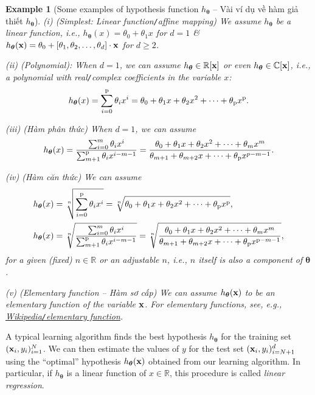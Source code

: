 \documentclass{article}
\newtheorem{example}{Example}
\begin{document}
\begin{example}[Some examples of hypothesis function $h_{\boldsymbol{\theta}}$ -- Vài ví dụ về hàm giả thiết $h_{\boldsymbol{\theta}}$]
	\item(i) {\rm(Simplest: Linear function{\tt/}affine mapping)} We assume $h_{\boldsymbol{\theta}}$ be a linear function, i.e., $h_{\boldsymbol{\theta}}(x) = \theta_0 + \theta_1x$ for $d = 1$ \& $h_{\boldsymbol{\theta}}({\bf x}) = \theta_0 + [\theta_1,\theta_2,\ldots,\theta_d]\cdot{\bf x}$ for $d\ge2$.
	\item(ii) {\rm(Polynomial)}: When $d = 1$, we can assume $h_{\boldsymbol{\theta}}\in\mathbb{R}[{\bf x}]$ or even $h_{\boldsymbol{\theta}}\in\mathbb{C}[{\bf x}]$, i.e., a polynomial with real{\tt/}complex coefficients in the variable $x$:
	\begin{equation*}
		h_{\boldsymbol{\theta}}(x) = \sum_{i=0}^{\rm p} \theta_ix^i = \theta_0 + \theta_1x + \theta_2x^2 + \cdots + \theta_{\rm p}x^{\rm p}.
	\end{equation*}
	\item(iii) {\rm(Hàm phân thức)} When $d = 1$, we can assume
	\begin{equation*}
		h_{\boldsymbol{\theta}}(x) = \frac{\sum_{i=0}^m \theta_ix^i}{\sum_{m+1}^{\rm p} \theta_ix^{i-m-1}} = \frac{\theta_0 + \theta_1x + \theta_2x^2 + \cdots + \theta_mx^m}{\theta_{m+1} + \theta_{m+2}x + \cdots + \theta_{\rm p}x^{p - m - 1}}.
	\end{equation*}
	\item(iv) {\rm(Hàm căn thức)} We can assume
	\begin{align*}
		h_{\boldsymbol{\theta}}(x) &= \sqrt[n]{\sum_{i=0}^{\rm p} \theta_ix^i} = \sqrt[n]{\theta_0 + \theta_1x + \theta_2x^2 + \cdots + \theta_{\rm p}x^{\rm p}},\\
		h_{\boldsymbol{\theta}}(x) &= \sqrt[n]{\frac{\sum_{i=0}^m \theta_ix^i}{\sum_{m+1}^{\rm p} \theta_ix^{i-m-1}}} = \sqrt[n]{\frac{\theta_0 + \theta_1x + \theta_2x^2 + \cdots + \theta_mx^m}{\theta_{m+1} + \theta_{m+2}x + \cdots + \theta_{\rm p}x^{{\rm p} - m - 1}}},
	\end{align*}
	for a given (fixed) $n\in\mathbb{R}$ or an adjustable $n$, i.e., $n$ itself is also a component of $\boldsymbol{\theta}$.
	\item(v) {\rm(Elementary function -- Hàm sơ cấp)} We can assume $h_{\boldsymbol{\theta}}({\bf x})$ to be an elementary function of the variable ${\bf x}$. For elementary functions, see, e.g., \href{https://en.wikipedia.org/wiki/Elementary_function}{Wikipedia{\tt/}elementary function}.
\end{example}
A typical learning algorithm finds the best hypothesis $h_{\boldsymbol{\theta}}$ for the training set $({\bf x}_i,y_i)_{i=1}^N$. We can then estimate the values of $y$ for the test set $({\bf x}_i,y_i)_{i=N+1}^d$ using the ``optimal'' hypothesis $h_{\boldsymbol{\theta}}({\bf x})$ obtained from our learning algorithm. In particular, if $h_{\boldsymbol{\theta}}$ is a linear function of $x\in\mathbb{R}$, this procedure is called {\it linear regression}.
\end{document}
